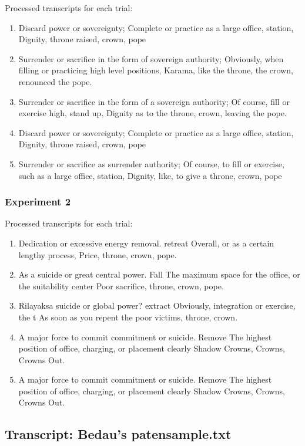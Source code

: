 \documentclass{article}
\begin{document}
Processed transcripts for each trial:

\begin{enumerate}
\item 
Discard power or sovereignty;
Complete or practice as a large office, station,
Dignity, throne raised, crown, pope


\item 
Surrender or sacrifice in the form of sovereign authority;
Obviously, when filling or practicing high level positions,
Karama, like the throne, the crown, renounced the pope.


\item 
Surrender or sacrifice in the form of a sovereign authority;
Of course, fill or exercise high, stand up,
Dignity as to the throne, crown, leaving the pope.



\item 
Discard power or sovereignty;
Complete or practice as a large office, station,
Dignity, throne raised, crown, pope



\item 
Surrender or sacrifice as surrender authority;
Of course, to fill or exercise, such as a large office, station,
Dignity, like, to give a throne, crown, pope

\end{enumerate}\subsubsection{Experiment 2}

Processed transcripts for each trial:

\begin{enumerate}
\item 
Dedication or excessive energy removal. retreat
Overall, or as a certain lengthy process,
Price, throne, crown, pope.


\item 
As a suicide or great central power. Fall
The maximum space for the office, or the suitability center
Poor sacrifice, throne, crown, pope.


\item 
Rilayaksa suicide or global power? extract
Obviously, integration or exercise, the  t
As soon as you repent the poor victims, throne, crown.


\item 
A major force to commit commitment or suicide. Remove
The highest position of office, charging, or placement clearly
Shadow Crowns, Crowns, Crowns Out.


\item 
A major force to commit commitment or suicide. Remove
The highest position of office, charging, or placement clearly
Shadow Crowns, Crowns, Crowns Out.

\end{enumerate}\subsection{Transcript: Bedau’s patensample.txt}
\end{document}
